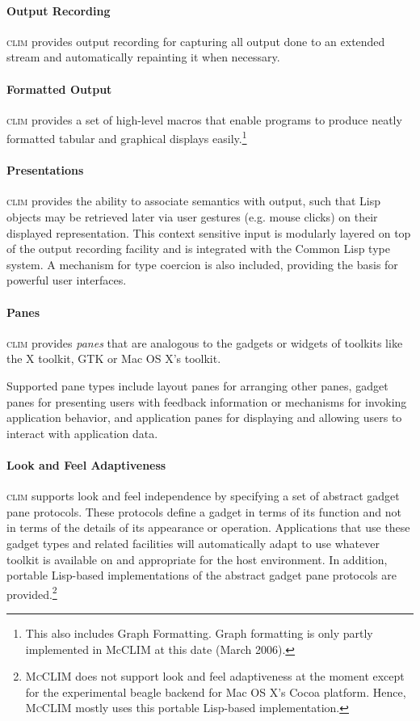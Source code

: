 \documentclass[twocolumn,a4paper]{article}
\newcommand {\concept} [1] {{\sl #1}\index{#1}}
\newcommand {\CLIM}{\textsc{clim}}
\newcommand {\mcclim}{\textsc{McCLIM}}
\begin{document}
\paragraph*{Output Recording} \CLIM{} provides output recording for
capturing all output done to an extended stream and automatically
repainting it when necessary.

\paragraph*{Formatted Output} \CLIM{} provides a set of high-level
macros that enable programs to produce neatly formatted tabular and
graphical displays easily.\footnote{This also includes Graph
  Formatting.  Graph formatting is only partly implemented in McCLIM
  at this date (March 2006).}

\paragraph*{Presentations} \CLIM{} provides the ability to associate
semantics with output, such that Lisp objects may be retrieved later
via user gestures (e.g.{} mouse clicks) on their displayed
representation. This context sensitive input is modularly layered on
top of the output recording facility and is integrated with the Common
Lisp type system. 
A mechanism for type coercion is also included,
providing the basis for powerful user interfaces.

\paragraph*{Panes} \CLIM{} provides \concept{panes} that are analogous
to the gadgets or widgets of toolkits like the X toolkit, GTK or Mac
OS X's toolkit.

Supported pane types include layout panes for arranging other panes,
gadget panes for presenting users with feedback information or
mechanisms for invoking application behavior, and application panes
for displaying and allowing users to interact with application data.

\paragraph*{Look and Feel Adaptiveness} \CLIM{} supports look and feel
independence by specifying a set of abstract gadget pane
protocols. These protocols define a gadget in terms of its function
and not in terms of the details of its appearance or
operation. Applications that use these gadget types and related
facilities will automatically adapt to use whatever toolkit is
available on and appropriate for the host environment. In addition,
portable Lisp-based implementations of the abstract gadget pane
protocols are provided.\footnote{\mcclim{} does not support look and feel
  adaptiveness at the moment except for the experimental beagle backend for Mac
  OS X's Cocoa platform. Hence, \mcclim{} mostly uses this portable Lisp-based
  implementation.}
\end{document}
